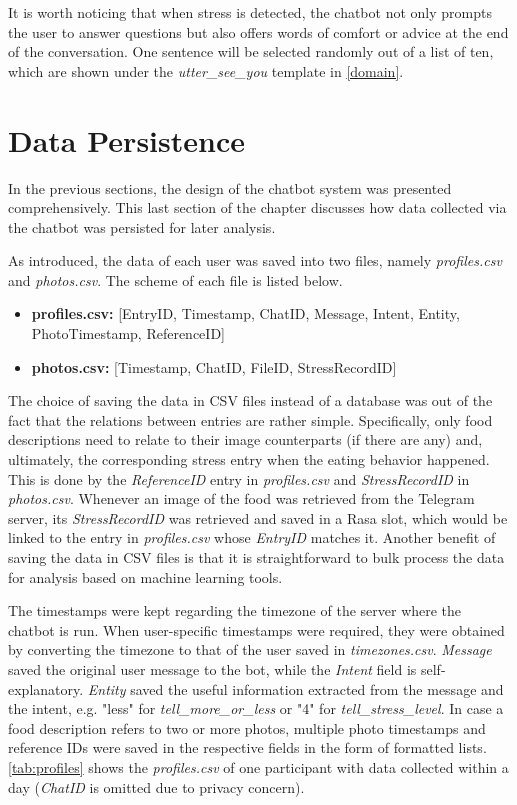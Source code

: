 It is worth noticing that when stress is detected, the chatbot not only prompts the user to answer questions but also offers words of comfort or advice at the end of the conversation. One sentence will be selected randomly out of a list of ten, which are shown under the \emph{utter\_see\_you} template in \autoref{domain}.

\section{Data Persistence} \label{data_persis}
In the previous sections, the design of the chatbot system was presented comprehensively. This last section of the chapter discusses how data collected via the chatbot was persisted for later analysis.

As introduced, the data of each user was saved into two files, namely \emph{profiles.csv} and \emph{photos.csv}. The scheme of each file is listed below.

\begin{itemize}
  \item \textbf{profiles.csv:} [EntryID, Timestamp, ChatID, Message, Intent, Entity, PhotoTimestamp, ReferenceID]
  \item \textbf{photos.csv:} [Timestamp, ChatID, FileID, StressRecordID]
\end{itemize}

The choice of saving the data in CSV files instead of a database was out of the fact that the relations between entries are rather simple. Specifically, only food descriptions need to relate to their image counterparts (if there are any) and, ultimately, the corresponding stress entry when the eating behavior happened. This is done by the \emph{ReferenceID} entry in \emph{profiles.csv} and \emph{StressRecordID} in \emph{photos.csv}. Whenever an image of the food was retrieved from the Telegram server, its \emph{StressRecordID} was retrieved and saved in a Rasa slot, which would be linked to the entry in \emph{profiles.csv} whose \emph{EntryID} matches it. Another benefit of saving the data in CSV files is that it is straightforward to bulk process the data for analysis based on machine learning tools.

The timestamps were kept regarding the timezone of the server where the chatbot is run. When user-specific timestamps were required, they were obtained by converting the timezone to that of the user saved in \emph{timezones.csv}. \emph{Message} saved the original user message to the bot, while the \emph{Intent} field is self-explanatory. \emph{Entity} saved the useful information extracted from the message and the intent, e.g. "less" for \emph{tell\_more\_or\_less} or "4" for \emph{tell\_stress\_level}. In case a food description refers to two or more photos, multiple photo timestamps and reference IDs were saved in the respective fields in the form of formatted lists. \autoref{tab:profiles} shows the \emph{profiles.csv} of one participant with data collected within a day (\emph{ChatID} is omitted due to privacy concern).

